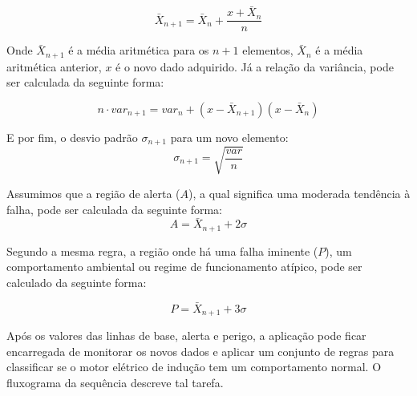 \begin{equation}\label{eq:ml}
    \bar{X}_{n+1} = \bar{X}_{n} + \frac{x + \bar{X}_n}{n}
\end{equation}

Onde $\bar{X}_{n+1}$ é a média aritmética para os $n+1$ elementos, $ \bar{X}_{n}$ é a média aritmética anterior,
$x$ é o novo dado adquirido. Já a relação da variância, pode ser calculada da seguinte forma:


\begin{equation}\label{eq:ml2}
    n \cdot var_{n+1} = var_{n} + (x - \bar{X}_{n+1})(x-\bar{X}_n)
\end{equation}

E por fim, o desvio padrão $\sigma_{n+1}$ para um novo elemento:
\begin{equation}\label{eq:ml3}
    \sigma_{n+1} = \sqrt{\frac{var}{n}}
\end{equation}

Assumimos que a região de alerta ($A$), a qual significa uma moderada tendência à falha, pode ser calculada da seguinte forma: 
\begin{equation}\label{eq:ml4}
    A = \bar{X}_{n+1} + 2 \sigma
\end{equation}

Segundo a mesma regra, a região onde há uma falha iminente ($P$), um comportamento ambiental ou regime de funcionamento atípico, 
pode ser calculado da seguinte forma:

\begin{equation}\label{eq:ml5}
    P = \bar{X}_{n+1} + 3 \sigma
\end{equation}

Após os valores das linhas de base, alerta e perigo, a aplicação pode ficar encarregada de monitorar os novos dados e aplicar um conjunto
de regras para classificar se o motor elétrico de indução tem um comportamento normal. O fluxograma da sequência descreve tal tarefa.

